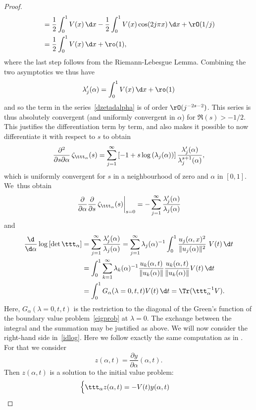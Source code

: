 \begin{proof}
\begin{align*}
& = \frac{ 1}{ 2}\int_{0}^{1} V(x) \,\d x - \frac{ 1}{ 2}\int_{0}^{1}
V(x)\cos(2j\pi x) \,\d x + \rO(1/j)\\
& = \frac{ 1}{ 2}\int_{0}^{1} V(x) \,\d x + \ro(1),
\end{align*}
where the last step follows from the Riemann-Lebesgue Lemma. Combining the two asymptotics we thus have
\[
\lambda_{j}'(\alpha) = \int_{0}^{1} V(x) \,\d x + \ro(1)
\]
and so the term in the series~\eqref{dzetadalpha} is of order $\rO(j^{-2s-2})$. This series is thus absolutely convergent (and uniformly convergent in
$\alpha$) for $\Re(s)>-1/2$. This justifies the differentiation term by term, and also makes it possible to now differentiate it with respect to $s$
to obtain
\[
\frac{ \partial^2}{ \partial s\partial\alpha }\,\zeta_{\ttt_{\alpha}}(s) = \sum_{j=1}^{\infty}\left[
-1+ s \log\left(\lambda_{j}(\alpha)\right)\right]\frac{\lambda_{j}'(\alpha)}{\lambda_{j}^{s+1}(\alpha)},
\]
which is uniformly convergent for $s$ in a neighbourhood of zero and $\alpha$ in $[0,1]$. We~thus obtain
\[
\left.\frac{ \partial}{ \partial \alpha}\frac{\partial}{ \partial s}\,\zeta_{\ttt_{\alpha}}(s)\right|_{s=0}=
-\sum_{j=1}^{\infty}\frac{\lambda_{j}'(\alpha)}{\lambda_{j}(\alpha)}
\]
and
\begin{align*}
\frac{\d}{\d\alpha} \log\left[ \det\ttt_{\alpha}\right] & = 
\sum_{j=1}^{\infty}\frac{\lambda_{j}'(\alpha)}{\lambda_{j}(\alpha)} = \sum_{j=1}^{\infty}\lambda_j(\alpha)^{-1} \int_0^1
\frac{u_{j}(\alpha,x)^2}{\|u_j(\alpha)\|^2} \ V(t) \,\d t\\
& = \int_0^1 \sum_{k=1}^{\infty} \lambda_k(\alpha)^{-1}
\frac{u_{k}(\alpha,t)}{\|u_k(\alpha)\|} \frac{u_{k}(\alpha,t)}{\|u_k(\alpha)\|} V(t)
\,\d t\\
& = \int_0^1 G_{\alpha}(\lambda=0,t,t) V(t) \,\d t = \Tr(\ttt_{\alpha}^{-1} V).
\end{align*}
Here, $G_{\alpha}(\lambda=0,t,t)$ is the restriction to the diagonal of the Green's function of the boundary value problem~\eqref{eigprob}
at $\lambda=0$. The exchange between the integral and the summation may be justified as above.
We will now consider the right-hand side in~\eqref{idlog}. Here we follow exactly the same computation as in \cite{Levit-Smilansky}.
For that we consider
\[
z(\alpha,t)=  \frac{\partial y}{\partial\alpha}(\alpha,t).
\]
Then $z(\alpha,t)$ is a solution to the initial value problem:
\begin{equation*}
\begin{cases}
\ttt_{\alpha} z(\alpha,t)=-V(t) y(\alpha,t)\\

\end{cases}
\end{equation*}
\end{proof}
